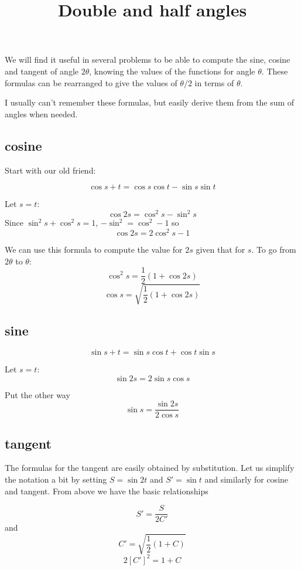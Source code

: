 \documentclass[11pt, oneside]{article}
\title{Double and half angles}
\date{}
\begin{document}
\maketitle
\Large

\label{sec:double_half_angles}

We will find it useful in several problems to be able to compute the sine, cosine and tangent of angle $2\theta$, knowing the values of the functions for angle $\theta$.  These formulas can be rearranged to give the values of $\theta/2$ in terms of $\theta$.

I usually can't remember these formulas, but easily derive them from the sum of angles when needed.

\subsection*{cosine}

Start with our old friend:

\[ \cos s + t = \cos s \cos t - \sin s \sin t \]

Let $s=t$:
\[ \cos 2s = \cos^2 s - \sin^2 s \]
Since $\sin^2 s + \cos^2 s = 1$, $-\sin^2 = \cos^2 - 1$ so
\[  \cos 2s = 2 \cos^2 s - 1 \]

We can use this formula to compute the value for $2s$ given that for $s$.  To go from $2\theta$ to $\theta$:
\[ \cos^2 s = \frac{1}{2}(1 + \cos 2s) \]
\[ \cos s = \sqrt{ \frac{1}{2}(1 + \cos 2s)} \]

\subsection*{sine}
\[ \sin s + t = \sin s \cos t + \cos t \sin s \]

Let $s = t$:
\[ \sin 2s = 2 \sin s \cos s \]

Put the other way
\[ \sin s = \frac{\sin 2s}{2 \cos s} \]

\subsection*{tangent}

The formulas for the tangent are easily obtained by substitution.  Let us simplify the notation a bit by setting $S = \sin 2t$ and $S' = \sin t$ and similarly for cosine and tangent.  From above we have the basic relationships

\[ S' = \frac{S}{2 C'} \]
and
\[ C' = \sqrt{\frac{1}{2} (1 + C)}  \]
\[ 2[C']^2 = 1 + C \]
\end{document}
